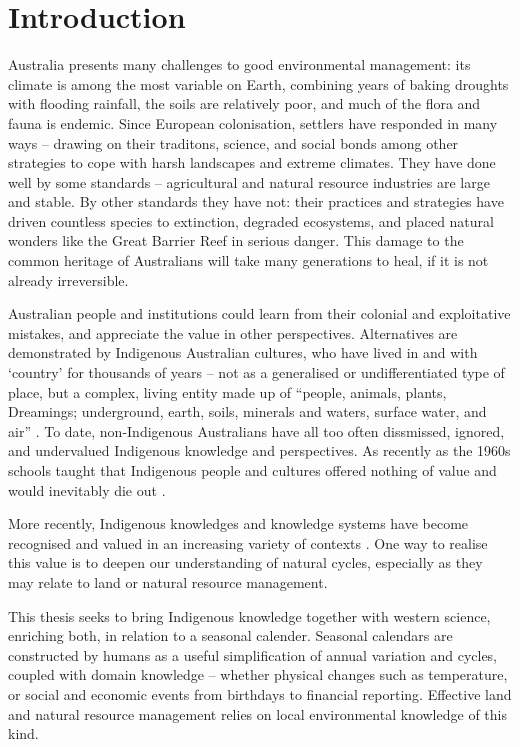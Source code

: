 \chapter{Introduction}
\label{ch:introduction}

Australia presents many challenges to good environmental management: its
climate is among the most variable on Earth, combining years of baking
droughts with flooding rainfall, the soils are relatively poor, and much of
the flora and fauna is endemic.
%
Since European colonisation, settlers have responded in many ways --
drawing on their traditons, science, and social bonds among other strategies to cope
with harsh landscapes and extreme climates.
%
They have done well by some standards -- agricultural and natural
resource industries are large and stable.  By other standards they have not:
their practices and strategies have driven countless species to extinction,
degraded ecosystems, and placed natural wonders like the Great Barrier Reef
in serious danger.  This damage to the common heritage of Australians will
take many generations to heal, if it is not already irreversible.

Australian people and institutions could learn from their colonial and exploitative mistakes,
and appreciate the value in other perspectives.  Alternatives are demonstrated
by Indigenous Australian cultures, who have lived in and with `country' for
thousands of years -- not as a generalised or undifferentiated
type of place, but a complex, living entity made up of ``people, animals,
plants, Dreamings; underground, earth, soils, minerals and waters, surface
water, and air'' \citep[][p7]{birdrose1996}.
%
To date, non-Indigenous Australians
have all too often dissmissed, ignored, and undervalued Indigenous knowledge
and perspectives.  As recently as the 1960s schools taught that Indigenous
people and cultures offered nothing of value and would inevitably die out
\citep{flannery1994}.


More recently, Indigenous knowledges and knowledge systems have become recognised and valued in an
increasing variety of contexts \citep[eg.][]{petheram2010,cochran2015,
berkes2012}.  One way to realise this value is to deepen our understanding
of natural cycles, especially as they may relate to land or natural resource
management.

This thesis seeks to bring Indigenous knowledge together with
western science, enriching both, in relation to a seasonal calender.
Seasonal calendars are constructed by humans as a useful simplification of
annual variation and cycles, coupled with domain knowledge -- whether
physical changes such as temperature, or social and economic events from birthdays to
financial reporting.  Effective land and natural resource management relies on
local environmental knowledge of this kind.

